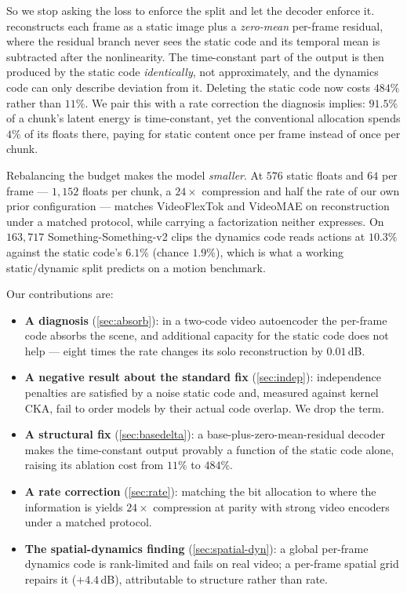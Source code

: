 So we stop asking the loss to enforce the split and let the decoder enforce it.
\method{} reconstructs each frame as a static image plus a \emph{zero-mean} per-frame
residual, where the residual branch never sees the static code and its temporal mean is
subtracted after the nonlinearity. The time-constant part of the output is then produced
by the static code \emph{identically}, not approximately, and the dynamics code can only
describe deviation from it. Deleting the static code now costs $484\%$ rather than
$11\%$. We pair this with a rate correction the diagnosis implies: $91.5\%$ of a chunk's
latent energy is time-constant, yet the conventional allocation spends $4\%$ of its
floats there, paying for static content once per frame instead of once per chunk.

Rebalancing the budget makes the model \emph{smaller}. At $576$ static floats and $64$
per frame --- $1{,}152$ floats per chunk, a $24\times$ compression and half the rate of
our own prior configuration --- \method{} matches VideoFlexTok and VideoMAE on
reconstruction under a matched protocol, while carrying a factorization neither
expresses. On $163{,}717$ Something-Something-v2 clips the dynamics code reads actions
at $10.3\%$ against the static code's $6.1\%$ (chance $1.9\%$), which is what a working
static/dynamic split predicts on a motion benchmark.

Our contributions are:
\begin{itemize}
  \item \textbf{A diagnosis} (\cref{sec:absorb}): in a two-code video autoencoder the
  per-frame code absorbs the scene, and additional capacity for the static code does not
  help --- eight times the rate changes its solo reconstruction by $0.01$\,dB.
  \item \textbf{A negative result about the standard fix} (\cref{sec:indep}):
  independence penalties are satisfied by a noise static code and, measured against
  kernel CKA, fail to order models by their actual code overlap. We drop the term.
  \item \textbf{A structural fix} (\cref{sec:basedelta}): a base-plus-zero-mean-residual
  decoder makes the time-constant output provably a function of the static code alone,
  raising its ablation cost from $11\%$ to $484\%$.
  \item \textbf{A rate correction} (\cref{sec:rate}): matching the bit allocation to
  where the information is yields $24\times$ compression at parity with strong video
  encoders under a matched protocol.
  \item \textbf{The spatial-dynamics finding} (\cref{sec:spatial-dyn}): a global
  per-frame dynamics code is rank-limited and fails on real video; a per-frame spatial
  grid repairs it ($+4.4$\,dB), attributable to structure rather than rate.
\end{itemize}

